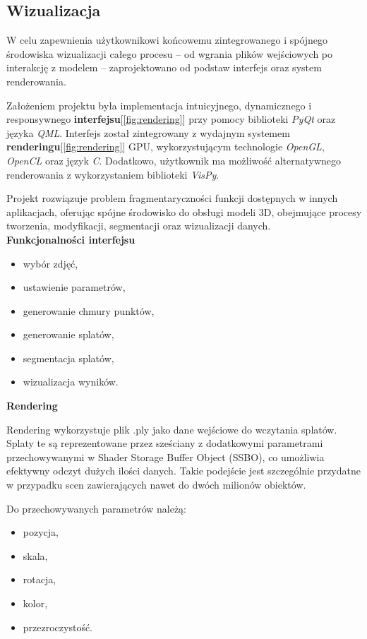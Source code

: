 \subsection{Wizualizacja}
W celu zapewnienia użytkownikowi końcowemu zintegrowanego i spójnego środowiska wizualizacji całego procesu – od wgrania plików wejściowych po interakcję z modelem – zaprojektowano od podstaw interfejs oraz system renderowania.

Założeniem projektu była implementacja intuicyjnego, dynamicznego i responsywnego \textbf{interfejsu}[\ref{fig:rendering}] przy pomocy biblioteki \textit{PyQt} oraz języka \textit{QML}. Interfejs został zintegrowany z wydajnym systemem \textbf{renderingu}[\ref{fig:rendering}] GPU, wykorzystującym technologie \textit{OpenGL}, \textit{OpenCL} oraz język \textit{C}. Dodatkowo, użytkownik ma możliwość alternatywnego renderowania z wykorzystaniem biblioteki \textit{VisPy}.

Projekt rozwiązuje problem fragmentaryczności funkcji dostępnych w innych aplikacjach, oferując spójne środowisko do obsługi modeli 3D, obejmujące procesy tworzenia, modyfikacji, segmentacji oraz wizualizacji danych.
\\[10pt]
\textbf{Funkcjonalności interfejsu}

\begin{itemize} \item wybór zdjęć, \item ustawienie parametrów, \item generowanie chmury punktów, \item generowanie splatów, \item segmentacja splatów, \item wizualizacja wyników. \end{itemize}

\vspace{10pt}
{\setlength{\parindent}{0pt}
\textbf{Rendering}
}

Rendering wykorzystuje plik .ply jako dane wejściowe do wczytania splatów. Splaty te są reprezentowane przez sześciany z dodatkowymi parametrami przechowywanymi w Shader Storage Buffer Object (SSBO), co umożliwia efektywny odczyt dużych ilości danych. Takie podejście jest szczególnie przydatne w przypadku scen zawierających nawet do dwóch milionów obiektów.

Do przechowywanych parametrów należą: \begin{itemize} \item pozycja, \item skala, \item rotacja, \item kolor, \item przezroczystość. \end{itemize}

